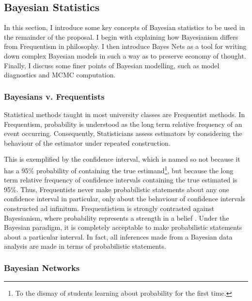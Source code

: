 \subsection{Bayesian Statistics}

In this section, I introduce some key concepts of Bayesian statistics to be used in the remainder of the proposal.  I begin with explaining how Bayesianism differs from Frequentism in philosophy.  I then introduce Bayes Nets as a tool for writing down complex Bayesian models in such a way as to preserve economy of thought.  Finally, I discuss some finer points of Bayesian modelling, such as model diagnostics and MCMC computation.


\subsubsection{Bayesians v. Frequentists}

Statistical methods taught in most  university classes are Frequentist methods.  In Frequentism, probability is understood as the long term relative frequency of an event occurring.  Consequently, Statisticians assess estimators by considering the behaviour of the estimator under repeated construction.  

This is exemplified by the confidence interval, which is named so not because it has a 95\% probability of containing the true estimand\footnote{To the dismay of students learning about probability for the first time.}, but because the long term relative frequency of confidence intervals containing the true estimated is 95\%.  Thus, Frequentists never make probabilistic statements about any one confidence interval in particular, only about the behaviour of confidence intervals constructed ad infinitum.  Frequentistism is strongly contrasted against Bayesianism, where probability represents a strength in a belief \cite{gelman2013bayesian}.  Under the Bayesian paradigm, it is completely acceptable to make probabilistic statements about a particular interval.  In fact, all inferences made from a Bayesian data analysis are made in terms of probabilistic statements.


\subsubsection{Bayesian Networks}

